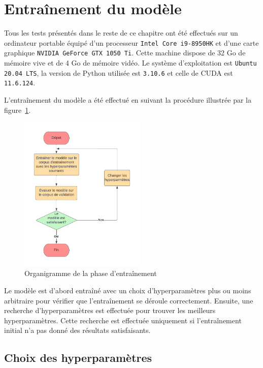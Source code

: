 \section{Entraînement du modèle}%
\label{sec.results.training}

Tous les tests présentés dans le reste de ce chapitre ont été effectués sur un ordinateur portable 
équipé d'un processeur \verb|Intel Core i9-8950HK| et d'une carte graphique \verb|NVIDIA GeForce GTX 1050 Ti|.
Cette machine dispose de 32 Go de mémoire vive et de 4 Go de mémoire vidéo.
Le système d'exploitation est \verb|Ubuntu 20.04 LTS|, 
la version de Python utilisée est \verb|3.10.6|
et celle de CUDA est \verb|11.6.124|.

L'entraînement du modèle a été effectué en suivant la procédure illustrée par la figure~\ref{fig.results.training}.
\begin{figure}[hbt]
    \begin{center}
        \includegraphics[width=6cm]{assets/pdf/Training.pdf}
    \end{center}
    \caption{Organigramme de la phase d'entraînement}%
    \label{fig.results.training}
\end{figure}
Le modèle est d'abord entraîné avec un choix d'hyperparamètres plus ou moins arbitraire
pour vérifier que l'entraînement se déroule correctement.
Ensuite, une recherche d'hyperparamètres est effectuée pour trouver les meilleurs hyperparamètres.
Cette recherche est effectuée uniquement si l'entraînement initial n'a pas donné des résultats satisfaisants.


\subsection{Choix des hyperparamètres}%
\label{sub.results.training.hyperparameters}

